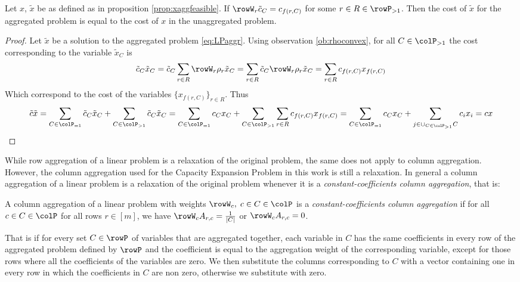 {\begin{observation}
  \label{ob:costpreserving}
  Let \(x\), \(\tilde{x}\) be as defined as in proposition \ref{prop:xaggfeasible}. If \(\rowW_r\tilde{c}_C = c_{f(r,C)}\) for some \(r \in R \in \rowP_{>1}\). Then the cost of \(\tilde{x}\) for the aggregated problem 
  is equal to the cost of \(x\) in the unaggregated problem. 
\end{observation}
\begin{proof}
  Let \(\tilde{x}\) be a solution to the aggregated problem \eqref{eq:LPaggr}. Using observation \ref{ob:rhoconvex}, for all \(C \in \colP_{>1}\) the cost corresponding to the variable \(\tilde{x}_C\) is 
  \[
  \tilde{c}_C\tilde{x}_C = \tilde{c}_C\sum_{r \in R}\rowW_r\rho_r\tilde{x}_C = \sum_{r \in R}\tilde{c}_C\rowW_r\rho_r\tilde{x}_C  = \sum_{r \in R}c_{f(r,C)}x_{f(r,C)}
  \]
  Which correspond to the cost of the variables \(\{x_{f(r,C)}\}_{r \in R}\). Thus
  \[
  \tilde{c}\tilde{x} = \sum_{C \in \colP_{=1}}\tilde{c}_C\tilde{x}_C + \sum_{C \in \colP_{>1}}\tilde{c}_C\tilde{x}_C = \sum_{C \in \colP_{=1}}c_Cx_C + \sum_{C \in \colP_{>1}}\sum_{r \in R}c_{f(r,C)}x_{f(r,C)} =  \sum_{C \in \colP_{=1}}c_Cx_C + \sum_{j \in \cup_{C \in \colP_{>1}}C}c_{i}x_{i} =  cx
  \]

\end{proof}


While row aggregation of a linear problem is a relaxation of the original problem, the same does not apply to column aggregation. However, the column aggregation used for the  Capacity Expansion Problem in this work is still a relaxation. In general a column aggregation of a linear problem is a relaxation of the original problem whenever it is a \emph{constant-coefficients column aggregation}, that is:
\begin{definition}
  A column aggregation  of a linear problem with weights \(\rowW_c,\; c \in C \in \colP \) is a \emph{constant-coefficients column aggregation}  if for all \(c \in C \in \colP\) for all rows \(r \in [m]\), we have \(\rowW_cA_{r,c} = \frac{1}{|C|}\) or  \(\rowW_cA_{r,c} = 0\).  
\end{definition}

That is if for every set \( C \in \rowP \) of variables that are aggregated together, each variable in \( C \) has the same coefficients in every row of the aggregated problem defined by \( \rowP \) and the coefficient is equal to the aggregation weight of the corresponding variable, except for those rows where all the coefficients of the variables are zero.
We then substitute the columns corresponding to \( C \) with a vector containing one in every row in which the coefficients in \(C\) are non zero, otherwise we substitute with zero.

}
